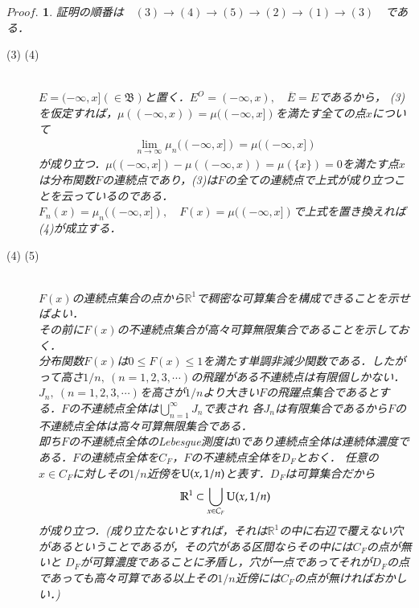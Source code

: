 \documentclass[a4j,papersize,disablejfam,slide,14pt]{jsarticle}
\newtheorem{Proof}{$Proof.$}
\begin{document}
    \begin{Proof}
    	証明の順番は$\quad (3) \to (4) \to (5) \to (2) \to (1) \to (3) \quad$である．
        \begin{description}
        	\item[{\large (3) \to (4)}]\mbox{}\\
            	$E = (-\infty, x] (\in \mathfrak{B})$と置く．$E^O = (-\infty, x),\quad \overline{E} = E$であるから，
                (3)を仮定すれば，$\mu((-\infty, x)) = \mu((-\infty, x])$を満たす全ての点$x$について
                \begin{align}
                	\lim_{n \to \infty} \mu_n((-\infty, x]) = \mu((-\infty, x])
                \end{align}
                が成り立つ．$\mu((-\infty, x]) - \mu((-\infty, x)) = \mu(\{x\}) = 0$を満たす点$x$は分布関数$F$の連続点であり，(3)は$F$の全ての連続点で上式が成り立つことを云っているのである．
                $F_n(x) = \mu_n((-\infty, x]),\quad F(x) = \mu((-\infty, x])$で上式を置き換えれば(4)が成立する．
            \item[{\large (4) \to (5)}]\mbox{}\\
            	$F(x)$の連続点集合の点から$\mathbb{R}^1$で稠密な可算集合を構成できることを示せばよい．\\
                その前に$F(x)$の不連続点集合が高々可算無限集合であることを示しておく．\\
                分布関数$F(x)$は$0 \leq F(x) \leq 1$を満たす単調非減少関数である．したがって高さ$1/n,\ (n=1,2,3,\cdots)$の飛躍がある不連続点は有限個しかない．
                $J_n,\ (n=1,2,3,\cdots)$を高さが$1/n$より大きい$F$の飛躍点集合であるとする．$F$の不連続点全体は$\bigcup_{n=1}^{\infty} J_n$で表され
                各$J_n$は有限集合であるから$F$の不連続点全体は高々可算無限集合である．\\
                即ち$F$の不連続点全体の{\rm Lebesgue}測度は$0$であり連続点全体は連続体濃度である．$F$の連続点全体を$C_F$，$F$の不連続点全体を$D_F$とおく．
                任意の$x \in C_F$に対しその$1/n$近傍を${\rm U}(x, 1/n)$と表す．$D_F$は可算集合だから
                \begin{align}
                	\mathbb{R}^1 \subset \bigcup_{x \in C_F} {\rm U}(x, 1/n)
                \end{align}
                が成り立つ．(成り立たないとすれば，それは$\mathbb{R}^1$の中に右辺で覆えない穴があるということであるが，その穴がある区間ならその中には$C_F$の点が無いと
                $D_F$が可算濃度であることに矛盾し，穴が一点であってそれが$D_F$の点であっても高々可算である以上その$1/n$近傍には$C_F$の点が無ければおかしい．)

\end{description}
\end{Proof}
\end{document}
